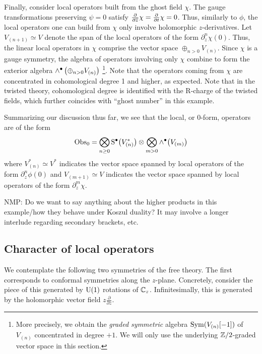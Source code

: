 \documentclass[11pt]{amsart}
\def\natalie#1{{\textcolor{green!65!black}{NMP: {#1}}}}
\begin{document}
Finally, consider local operators built from the ghost field $\chi$. 
The gauge transformations preserving $\psi = 0$ satisfy $\frac{\partial}{\partial {\overline{z}}} \chi = \frac{\partial}{\partial t} \chi = 0$. 
Thus, similarly to $\phi$, the local operators one can build from $\chi$ only involve holomorphic $z$-derivatives. 
Let $V_{(n+1)} \simeq V$ denote the span of the local operators of the form $\partial_z^n \chi(0)$.
Thus, the linear local operators in $\chi$ comprise the vector space $\oplus_{n > 0} V_{(n)}$.
Since $\chi$ is a gauge symmetry, the algebra of operators involving only $\chi$ combine to form the exterior algebra $\wedge^\bullet \left(\oplus_{n > 0} V_{(n)}\right)$ \footnote{More precisely, we obtain the {\em graded symmetric} algebra $\operatorname{Sym}(V_{(n)}[-1])$ of $V_{(n)}$ concentrated in degree $+1$.
We will only use the underlying $\mathbb Z/2$-graded vector space in this section.}. Note that the operators coming from $\chi$ are concentrated in cohomological degree 1 and higher, as expected. Note that in the twisted theory, cohomological degree is identified with the R-charge of the twisted fields, which further coincides with ``ghost number'' in this example. 

Summarizing our discussion thus far, we see that the local, or 0-form, operators are of the form
\[
{\rm Obs}_0 = \bigotimes_{n \geq 0} {\rm S}^\bullet \big(V^*_{(n)}\big) \otimes \bigotimes_{m > 0} \wedge^\bullet \big(V_{(m)}\big)
\]
where $V_{(n)}^* \simeq V^*$ indicates the vector space spanned by local operators of the form $\partial^n_{z} \phi(0)$ and $V_{(m+1)} \simeq V$ indicates the vector space spanned by local operators of the form $\partial^{m}_z \chi$. 

\natalie{Do we want to say anything about the higher products in this example/how they behave under Koszul duality? It may involve a longer interlude regarding secondary brackets, etc.}

\subsection*{Character of local operators}

We contemplate the following two symmetries of the free theory.
The first corresponds to conformal symmetries along the $z$-plane. 
Concretely, consider the piece of this generated by ${\rm U}(1)$ rotations of $\mathbb C_z$.
Infinitesimally, this is generated by the holomorphic vector field $z \frac{\partial}{\partial z}$. 
\end{document}
